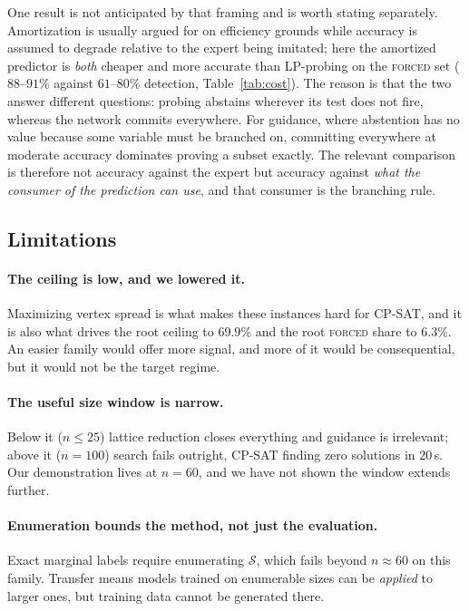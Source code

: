 \documentclass[12pt]{article}
\begin{document}
One result is not anticipated by that framing and is worth stating separately. Amortization is usually argued for on efficiency grounds while accuracy is assumed to degrade relative to the expert being imitated; here the amortized predictor is \emph{both} cheaper and more accurate than LP-probing on the \textsc{forced} set ($88$--$91\%$ against $61$--$80\%$ detection, Table~\ref{tab:cost}). The reason is that the two answer different questions: probing abstains wherever its test does not fire, whereas the network commits everywhere. For guidance, where abstention has no value because some variable must be branched on, committing everywhere at moderate accuracy dominates proving a subset exactly. The relevant comparison is therefore not accuracy against the expert but accuracy against \emph{what the consumer of the prediction can use}, and that consumer is the branching rule.

\subsection{Limitations}

\paragraph{The ceiling is low, and we lowered it.} Maximizing vertex spread is what makes these instances hard for CP-SAT, and it is also what drives the root ceiling to $69.9\%$ and the root \textsc{forced} share to $6.3\%$. An easier family would offer more signal, and more of it would be consequential, but it would not be the target regime.

\paragraph{The useful size window is narrow.} Below it (\(n\le25\)) lattice reduction closes everything and guidance is irrelevant; above it ($n=100$) search fails outright, CP-SAT finding zero solutions in $20$\,s. Our demonstration lives at $n=60$, and we have not shown the window extends further.

\paragraph{Enumeration bounds the method, not just the evaluation.} Exact marginal labels require enumerating $\mathcal{S}$, which fails beyond $n\approx60$ on this family. Transfer means models trained on enumerable sizes can be \emph{applied} to larger ones, but training data cannot be generated there.
\end{document}
